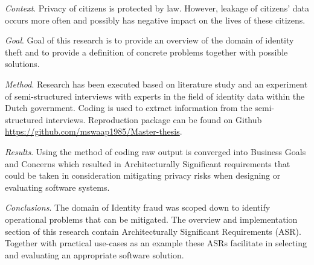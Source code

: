 


\begin{abstracts}        %

\noindent \textit{Context}. 
Privacy of citizens is protected by law. However, leakage of citizens' data occurs more often and possibly has negative impact on the lives of these citizens.

\noindent \textit{Goal}. 
Goal of this research is to provide an overview of the domain of identity theft and to provide a definition of concrete problems together with possible solutions.

\noindent \textit{Method}. 
Research has been executed based on literature study and an experiment of semi-structured interviews with experts in the field of identity data within the Dutch government. 
Coding is used to extract information from the semi-structured interviews. Reproduction package can be found on Github \url{https://github.com/mswaap1985/Master-thesis}.

\noindent \textit{Results}. 
Using the method of coding raw output is converged into Business Goals and Concerns which resulted in Architecturally Significant requirements that could be taken in consideration mitigating privacy risks when designing or evaluating software systems.

\noindent \textit{Conclusions}. 
The domain of Identity fraud was scoped down to identify operational problems that can be mitigated. The overview and implementation section of this research contain Architecturally Significant Requirements (ASR). Together with practical use-cases as an example these ASRs facilitate in selecting and evaluating an appropriate software solution. 

\end{abstracts}


